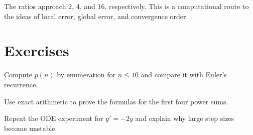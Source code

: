 The ratios approach $2$, $4$, and $16$, respectively. This is a computational route
to the ideas of local error, global error, and convergence order.

\section{Exercises}
\begin{exercise}
Compute $p(n)$ by enumeration for $n\leq 10$ and compare it with Euler's recurrence.
\end{exercise}
\begin{exercise}
Use exact arithmetic to prove the formulas for the first four power sums.
\end{exercise}
\begin{exercise}
Repeat the ODE experiment for $y'=-2y$ and explain why large step sizes become unstable.
\end{exercise}
